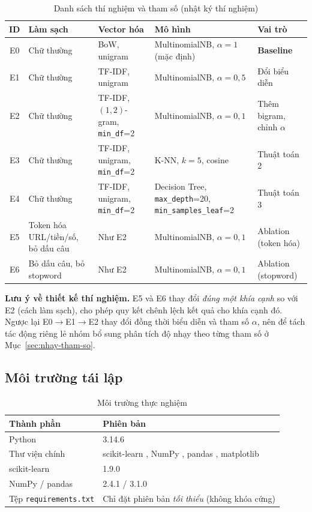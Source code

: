 \begin{table}[H]
\centering
\caption{Danh sách thí nghiệm và tham số (nhật ký thí nghiệm)}
\label{tab:thi-nghiem}
\small
\begin{tabular}{|c|p{3.2cm}|p{2.9cm}|p{3.3cm}|p{2.2cm}|}
\hline
\textbf{ID} & \textbf{Làm sạch} & \textbf{Vector hóa} & \textbf{Mô hình} & \textbf{Vai trò} \\
\hline
E0 & Chữ thường & BoW, unigram & MultinomialNB, $\alpha=1$ (mặc định) & \textbf{Baseline} \\
\hline
E1 & Chữ thường & TF-IDF, unigram & MultinomialNB, $\alpha=0{,}5$ & Đổi biểu diễn \\
\hline
E2 & Chữ thường & TF-IDF, $(1,2)$-gram, \texttt{min\_df}=2 & MultinomialNB, $\alpha=0{,}1$ & Thêm bigram, chỉnh $\alpha$ \\
\hline
E3 & Chữ thường & TF-IDF, unigram, \texttt{min\_df}=2 & K-NN, $k=5$, cosine & Thuật toán 2 \\
\hline
E4 & Chữ thường & TF-IDF, unigram, \texttt{min\_df}=2 & Decision Tree, \texttt{max\_depth}=20, \texttt{min\_samples\_leaf}=2 & Thuật toán 3 \\
\hline
E5 & Token hóa URL/tiền/số, bỏ dấu câu & Như E2 & MultinomialNB, $\alpha=0{,}1$ & Ablation (token hóa) \\
\hline
E6 & Bỏ dấu câu, bỏ stopword & Như E2 & MultinomialNB, $\alpha=0{,}1$ & Ablation (stopword) \\
\hline
\end{tabular}
\end{table}

\textbf{Lưu ý về thiết kế thí nghiệm.} E5 và E6 thay đổi \textit{đúng một khía cạnh} so với E2 (cách làm sạch), cho phép quy kết chênh lệch kết quả cho khía cạnh đó. Ngược lại E0$\to$E1$\to$E2 thay đổi đồng thời biểu diễn và tham số $\alpha$, nên để tách tác động riêng lẻ nhóm bổ sung phân tích độ nhạy theo từng tham số ở Mục~\ref{sec:nhay-tham-so}.

\subsection{Môi trường tái lập}

\begin{table}[H]
\centering
\caption{Môi trường thực nghiệm}
\label{tab:moi-truong}
\begin{tabular}{|p{5cm}|p{9cm}|}
\hline
\textbf{Thành phần} & \textbf{Phiên bản} \\
\hline
Python & 3.14.6 \\
\hline
Thư viện chính & scikit-learn \cite{scikit-learn}, NumPy \cite{numpy2020}, pandas \cite{pandas2010}, matplotlib \cite{matplotlib2007} \\
\hline
scikit-learn & 1.9.0 \\
\hline
NumPy / pandas & 2.4.1 / 3.1.0 \\
\hline
Tệp \texttt{requirements.txt} & Chỉ đặt phiên bản \textit{tối thiểu} (không khóa cứng) \\
\hline
\end{tabular}
\end{table}

